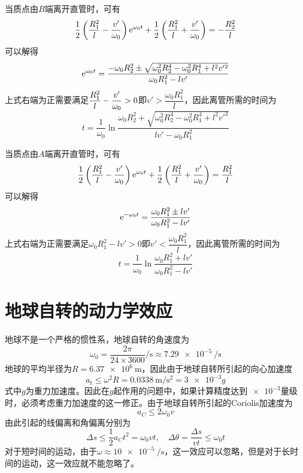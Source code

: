 \begin{solution}
当质点由$B$端离开直管时，可有
\begin{equation*}
	\frac12 \left(\frac{R_1^2}{l} - \frac{v'}{\omega_0}\right)\mathrm{e}^{\omega_0t}+\frac12 \left(\frac{R_1^2}{l} + \frac{v'}{\omega_0}\right) = -\frac{R_2^2}{l}
\end{equation*}
可以解得
\begin{equation*}
	\mathrm{e}^{\omega_0t} = \frac{-\omega_0R_2^2\pm \sqrt{\omega_0^2R_2^4-\omega_0^2R_1^4+l^2v'^2}}{\omega_0R_1^2-lv'}
\end{equation*}
上式右端为正需要满足$\displaystyle\frac{R_1^2}{l} - \frac{v'}{\omega_0} > 0$即$v'>\dfrac{\omega_0R_1^2}{l}$，因此离管所需的时间为
\begin{equation*}
	t = \frac{1}{\omega_0} \ln \frac{\omega_0R_2^2+\sqrt{\omega_0^2R_2^4-\omega_0^2R_1^4+l^2v'^2}}{lv'-\omega_0R_1^2}
\end{equation*}

当质点由$A$端离开直管时，可有
\begin{equation*}
	\frac12 \left(\frac{R_1^2}{l} - \frac{v'}{\omega_0}\right)\mathrm{e}^{\omega_0t}+\frac12 \left(\frac{R_1^2}{l} + \frac{v'}{\omega_0}\right) = \frac{R_1^2}{l}
\end{equation*}
可以解得
\begin{equation*}
	\mathrm{e}^{-\omega_0t} = \frac{\omega_0R_1^2\pm lv'}{\omega_0R_1^2-lv'}
\end{equation*}
上式右端为正需要满足$\omega_0R_1^2-lv'>0$即$v'<\dfrac{\omega_0R_1^2}{l}$，因此离管所需的时间为
\begin{equation*}
	t = \frac{1}{\omega_0}\ln \frac{\omega_0R_1^2+lv'}{\omega_0R_1^2-lv'}
\end{equation*}
\end{solution}

\section{地球自转的动力学效应}

地球不是一个严格的惯性系，地球自转的角速度为
\begin{equation*}
	\omega_0 = \frac{2\pi}{24 \times 3600}\si{\per\second} \approx \SI{7.29e-5}{\per\second}
\end{equation*}
地球的平均半径为$R = \SI{6.37e6}{\meter}$，因此由于地球自转所引起的向心加速度
\begin{equation*}
	a_t \leqslant \omega^2 R = \SI[per-mode=symbol]{0.0338}{\meter\per\second\squared} = \num{3e-3} g
\end{equation*}
式中$g$为重力加速度。因此在$g$起作用的问题中，如果计算精度达到$\num{e-3}$量级时，必须考虑重力加速度的这一修正。由于地球自转所引起的Coriolis加速度为
\begin{equation*}
	a_C \leqslant 2\omega_0 v
\end{equation*}
由此引起的线偏离和角偏离分别为
\begin{equation*}
	\Delta s \leqslant \frac12 a_C t^2 = \omega_0 vt,\quad \Delta \theta = \frac{\Delta s}{vt} \leqslant \omega_0 t
\end{equation*}
对于短时间的运动，由于$\omega \approx \SI{10e-5}{\per\second}$，这一效应可以忽略，但是对于长时间的运动，这一效应就不能忽略了。

